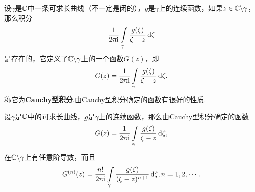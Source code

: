 设$\gamma$是$\mathbb C$中一条可求长曲线（不一定是闭的），$g$是$\gamma$上的连续函数，如果$z\in\mathbb C\backslash\gamma$，那么积分
\[
  \frac1{2\uppi\mathrm i}\int\limits_\gamma\frac{g(\zeta)}{\zeta-z}\mathop{}\!\mathrm{d} \zeta
\]
是存在的，它定义了$\mathbb C\backslash\gamma$上的一个函数$G(z)$，即
\[
  G(z) = \frac1{2\uppi\mathrm i}\int\limits_\gamma\frac{g(\zeta)}{\zeta-z}\mathop{}\!\mathrm{d} \zeta,
\]
称它为\textbf{Cauchy型积分}.由Cauchy型积分确定的函数有很好的性质.
\begin{theorem}\label{thm3.4.2}
  设$\gamma$是$\mathbb C$中的可求长曲线，$g$是$\gamma$上的连续函数，那么由Cauchy型积分确定的函数
  \[
    G(z) = \frac1{2\uppi\mathrm i}\int\limits_\gamma\frac{g(\zeta)}{\zeta-z}\mathop{}\!\mathrm{d} \zeta,
  \]
 在$\mathbb C\backslash\gamma$上有任意阶导数，而且
  \begin{equation}\label{eq3.4.4}
    G^{(n)}(z) = \frac{n!}{2\uppi\mathrm i}\int\limits_\gamma \frac{g(\zeta)}{(\zeta-z)^{n+1}}\mathop{}\!\mathrm{d} \zeta,n=1,2,\cdots.
  \end{equation}
\end{theorem}
